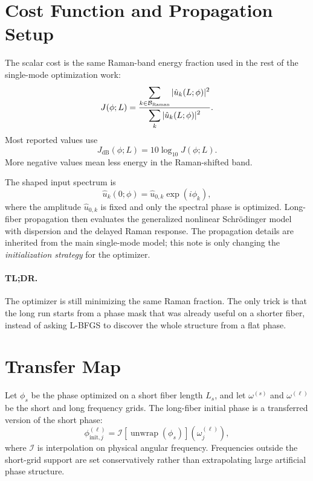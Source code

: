 \documentclass[11pt]{article}
\begin{document}
\section{Cost Function and Propagation Setup}

The scalar cost is the same Raman-band energy fraction used in the rest of the
single-mode optimization work:
\begin{equation}
J(\phi;L)=
\frac{\displaystyle\sum_{k\in \mathcal{B}_{\mathrm{Raman}}} |\hat u_k(L;\phi)|^2}
{\displaystyle\sum_k |\hat u_k(L;\phi)|^2}.
\label{eq:raman-fraction}
\end{equation}
Most reported values use
\begin{equation}
J_{\mathrm{dB}}(\phi;L)=10\log_{10}J(\phi;L).
\label{eq:db-cost}
\end{equation}
More negative values mean less energy in the Raman-shifted band.

The shaped input spectrum is
\begin{equation}
\hat u_k(0;\phi)=\hat u_{0,k}\exp(i\phi_k),
\label{eq:input-phase}
\end{equation}
where the amplitude $\hat u_{0,k}$ is fixed and only the spectral phase is
optimized.  Long-fiber propagation then evaluates the generalized nonlinear
Schr\"odinger model with dispersion and the delayed Raman response.  The
propagation details are inherited from the main single-mode model; this note is
only changing the \emph{initialization strategy} for the optimizer.

\paragraph{TL;DR.}
The optimizer is still minimizing the same Raman fraction.  The only trick is
that the long run starts from a phase mask that was already useful on a shorter
fiber, instead of asking L-BFGS to discover the whole structure from a flat
phase.

\section{Transfer Map}

Let $\phi_s$ be the phase optimized on a short fiber length $L_s$, and let
$\omega^{(s)}$ and $\omega^{(\ell)}$ be the short and long frequency grids.  The
long-fiber initial phase is a transferred version of the short phase:
\begin{equation}
\phi_{\mathrm{init},j}^{(\ell)}
= \mathcal I\!\left[\operatorname{unwrap}(\phi_s)\right]\!
\left(\omega^{(\ell)}_j\right),
\label{eq:interpolation}
\end{equation}
where $\mathcal I$ is interpolation on physical angular frequency.  Frequencies
outside the short-grid support are set conservatively rather than extrapolating
large artificial phase structure.
\end{document}
